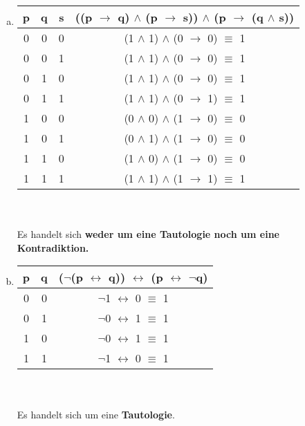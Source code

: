 \documentclass[12pt,a4paper]{article}
\begin{document}
\begin{enumerate}[a)]
\item 
\begin{tabular}{c|c|c|c}
p & q & s & ((p $\rightarrow$ q)  $\land$ (p $\rightarrow$ s)) $\land$ (p $\rightarrow$ (q $\land$ s))\\
\hline
0 & 0 & 0 & (1 $\land$ 1) $\land$ (0 $\rightarrow$ 0) $\equiv$ 1\\
0 & 0 & 1 &  (1 $\land$ 1) $\land$ (0 $\rightarrow$ 0) $\equiv$ 1\\
0 & 1 & 0 &  (1 $\land$ 1) $\land$ (0 $\rightarrow$ 0) $\equiv$ 1\\
0 & 1 & 1 &  (1 $\land$ 1) $\land$ (0 $\rightarrow$ 1) $\equiv$ 1\\
1 & 0 & 0 &  (0 $\land$ 0) $\land$ (1 $\rightarrow$ 0) $\equiv$ 0\\
1 & 0 & 1 &  (0 $\land$ 1) $\land$ (1 $\rightarrow$ 0) $\equiv$ 0\\
1 & 1 & 0 &  (1 $\land$ 0) $\land$ (1 $\rightarrow$ 0) $\equiv$ 0\\
1 & 1 & 1 &  (1 $\land$ 1) $\land$ (1 $\rightarrow$ 1) $\equiv$ 1\\
\end{tabular}\\
\\
Es handelt sich \textbf{weder um eine Tautologie noch um eine Kontradiktion.}
\item 
\begin{tabular}{c|c|c}
p & q & ($\neg$(p $\leftrightarrow$ q)) $\leftrightarrow$ (p $\leftrightarrow$ $\neg$q)\\
\hline
0 & 0 & $\neg$1 $\leftrightarrow$ 0 $\equiv$ 1\\
0 & 1 & $\neg$0 $\leftrightarrow$ 1 $\equiv$ 1\\
1 & 0 & $\neg$0 $\leftrightarrow$ 1 $\equiv$ 1\\
1 & 1 & $\neg$1 $\leftrightarrow$ 0 $\equiv$ 1\\
\end{tabular}\\
\\
Es handelt sich um eine \textbf{Tautologie}.
\end{enumerate}
\end{document}
